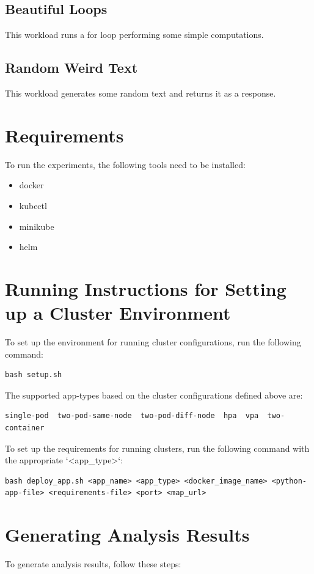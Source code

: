 \documentclass{article}
\begin{document}
\subsection{Beautiful Loops}
This workload runs a for loop performing some simple computations.

\subsection{Random Weird Text}
This workload generates some random text and returns it as a response.

\section{Requirements}
To run the experiments, the following tools need to be installed:

\begin{itemize}
   \item docker
   \item kubectl
   \item minikube
   \item helm
\end{itemize}

\section{Running Instructions for Setting up a Cluster Environment}
To set up the environment for running cluster configurations, run the following command:

\begin{verbatim}
bash setup.sh
\end{verbatim}

The supported app-types based on the cluster configurations defined above are:

\begin{verbatim}
single-pod  two-pod-same-node  two-pod-diff-node  hpa  vpa  two-container
\end{verbatim}

To set up the requirements for running clusters, run the following command with the appropriate `<app_type>`:

\begin{verbatim}
bash deploy_app.sh <app_name> <app_type> <docker_image_name> <python-app-file> <requirements-file> <port> <map_url>
\end{verbatim}

\section{Generating Analysis Results}
To generate analysis results, follow these steps:
\end{document}
